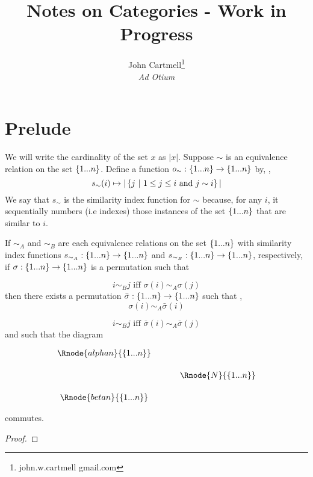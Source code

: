 \documentclass[10pt,a4paper]{scrartcl}
\title{Notes on Categories - Work in Progress}
\author{John Cartmell\footnote{john.w.cartmell gmail.com}\\ \normalsize{\textit{Ad Otium}}}
\begin{document}
\section{Prelude}
We will write the cardinality of the set $x$ as $|x|$.
Suppose $\sim$ is an equivalence relation on the set $\left\{1...n\right\}$.
Define a function $o_\sim : \left\{1...n\right\} \rightarrow \left\{1...n\right\}$ by, \foreachi,
$$
s_\sim(i) \mapsto |\left\{j \ \middle|\ 1 \leq j \leq i \mbox{ and }j \sim i\right\}|
$$
\noindent We say that $s_\sim$ is the similarity index
function for $\sim$ because, for any $i$, it sequentially numbers (i.e indexes) those instances
of the set $\left\{1...n\right\}$ that are similar to $i$. 


\newcommand{\sigmabar}{\bar{\sigma}}

\begin{lemma}
If $\sim_A$ and $\sim_B$ are each equivalence relations on the set $\left\{1...n\right\}$ 
with similarity index functions $s_{\sim_A}: \left\{1...n\right\} \rightarrow \left\{1...n\right\}$
and $s_{\sim_B}: \left\{1...n\right\} \rightarrow \left\{1...n\right\}$, respectively,  if
$\sigma: \left\{1...n\right\} \rightarrow \left\{1...n\right\}$ is a permutation
such that


\begin{equation}
i \sim_B j \mbox{ iff } \sigma(i) \sim_A \sigma(j) 
\end{equation}
then there exists a permutation $\sigmabar: \set{\n} \morph \set{\n}$ such that \foreachi,
\begin{equation}
\sigma(i) \sim_A \sigmabar(i)
\end{equation}

\begin{equation}
i \sim_B j \mbox{ iff } \sigmabar(i) \sim_A \sigmabar(j) 
\end{equation}
and such that the diagram
\begin{center}
\begin{equation}
\label{preservingsimilarityindex}
\begin{array}{cp{.5cm}c}
\Rnode{alphan}{\set{\n}}  &&              \\ [0.5cm]
												  && \Rnode{N}{\set{\n}} \\ [0.5cm]
\Rnode{betan}{\set{\n}}   &&            
\end{array}
\end{equation}
\alabel{\sigmabar}
\end{center}
commutes.
\end{lemma}
\begin{proof}

\end{proof}
\end{document}
